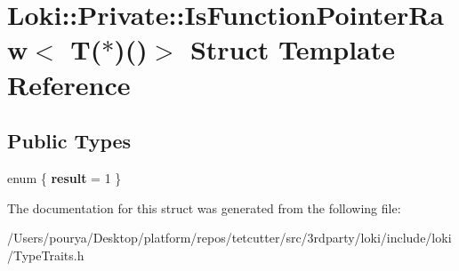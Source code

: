 \hypertarget{structLoki_1_1Private_1_1IsFunctionPointerRaw_3_01T_07_5_08_07_08_4}{}\section{Loki\+:\+:Private\+:\+:Is\+Function\+Pointer\+Raw$<$ T($\ast$)()$>$ Struct Template Reference}
\label{structLoki_1_1Private_1_1IsFunctionPointerRaw_3_01T_07_5_08_07_08_4}
\subsection*{Public Types}
\begin{DoxyCompactItemize}
\item 
\hypertarget{structLoki_1_1Private_1_1IsFunctionPointerRaw_3_01T_07_5_08_07_08_4_a00c215efa0306e8631792100b26dc71f}{}enum \{ {\bfseries result} = 1
 \}\label{structLoki_1_1Private_1_1IsFunctionPointerRaw_3_01T_07_5_08_07_08_4_a00c215efa0306e8631792100b26dc71f}

\end{DoxyCompactItemize}


The documentation for this struct was generated from the following file\+:\begin{DoxyCompactItemize}
\item 
/\+Users/pourya/\+Desktop/platform/repos/tetcutter/src/3rdparty/loki/include/loki/Type\+Traits.\+h\end{DoxyCompactItemize}
